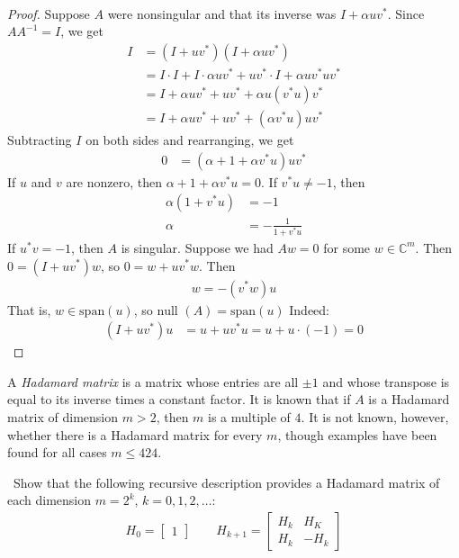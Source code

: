 \documentclass[12pt]{article}
\newenvironment{ex}[2][Exercise]{\begin{trivlist}
		\item[\hskip \labelsep {\bfseries #1}\hskip \labelsep {\bfseries #2.}]}{\end{trivlist}}
\newenvironment{sol}[1][Solution]{\begin{trivlist}
		\item[\hskip \labelsep {\bfseries #1:}]}{\end{trivlist}}
\begin{document}
\begin{sol}
	\
	\begin{proof}
		Suppose $A$ were nonsingular and that its inverse was $I+\alpha uv^*$. Since
		$AA^{-1}=I$, we get
		\begin{align*}
			I&=(I+uv^*)(I+\alpha uv^*)\\
			&=I\cdot I + I\cdot \alpha uv^* + uv^*\cdot I + \alpha uv^*uv^*\\
			&=I + \alpha uv^* + uv^* + \alpha u(v^*u)v^*\\
			&=I + \alpha uv^* + uv^* + (\alpha v^*u)uv^*
		\end{align*}
		Subtracting $I$ on both sides and rearranging, we get
		\begin{align*}
			0 &= (\alpha + 1 + \alpha v^*u)uv^*
		\end{align*}
		If $u$ and $v$ are nonzero, then $\alpha+1+\alpha v^*u=0$. If $v^*u\neq -1$, then
		\begin{align*}
			\alpha(1 + v^*u) &= -1\\
			\alpha &= -\frac{1}{1 + v^*u}
		\end{align*}
		If $u^*v=-1$, then $A$ is singular. Suppose we had $Aw=0$ for some $w\in \mathbb{C}^m$.
		Then $0=(I+uv^*)w$, so $0=w + uv^*w$. Then
		\begin{align*}
			w=-(v^*w)u
		\end{align*}
		That is, $w\in \text{span}(u)$, so $\text{null }(A)=\text{span}(u)$ Indeed:
		\begin{align*}
			(I+uv^*)u &= u + uv^*u = u + u\cdot (-1) = 0
		\end{align*}
	\end{proof}
\end{sol}

\begin{ex}{7}
	A \emph{Hadamard matrix} is a matrix whose entries are all $\pm 1$ and whose transpose is equal
	to its inverse times a constant factor. It is known that if $A$ is a Hadamard matrix of dimension
	$m> 2$, then $m$ is a multiple of $4$. It is not known, however, whether there is a Hadamard
	matrix for every $m$, though examples have been found for all cases $m\leq 424$.
	
	\
	Show that the following recursive description provides a Hadamard matrix of each dimension
	$m = 2^k$, $k=0,1,2,\ldots$:
	\begin{align*}
		H_0=\begin{bmatrix}
			1
		\end{bmatrix}
		\quad\quad
		H_{k+1} = \begin{bmatrix}
			H_k & H_K\\
			H_k & -H_k
		\end{bmatrix}
	\end{align*}
\end{ex}
\end{document}
